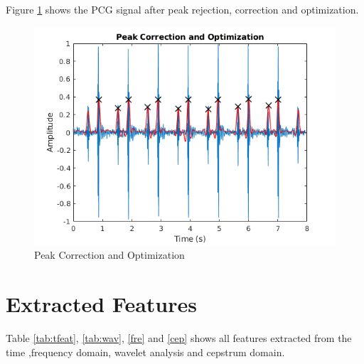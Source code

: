 \documentclass[10pt,twocolumn]{witseiepaper}
\begin{document}
Figure \ref{fig:10} shows the PCG signal after peak rejection, correction and optimization.
\begin{figure}[h!]
    \centering
    \includegraphics[scale = 0.55]{5.png}
    \caption{Peak Correction and Optimization}
    \label{fig:10}
\end{figure}{}

\twocolumn
\newpage
\section{Extracted Features}
\label{app:features}
Table \ref{tab:tfeat}, \ref{tab:wav}, \ref{fre} and  \ref{cep} shows all features  extracted from the time ,frequency domain, wavelet analysis and cepstrum domain.
\end{document}
